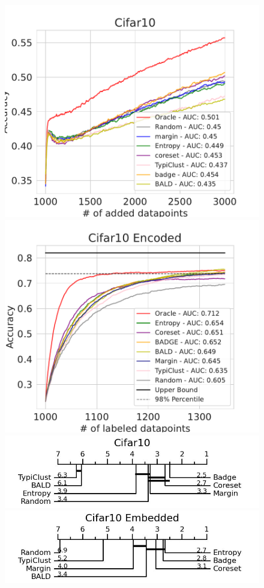 \documentclass[]{article}
\begin{document}
\begin{figure}[H]
\centering
\includegraphics[width=0.49\linewidth]{img/eval_cifar10}
\includegraphics[width=0.49\linewidth]{img/eval_cifar10_enc} \\ [2mm]
\includegraphics[width=0.49\linewidth]{img/micro_cifar10.jpg}
\includegraphics[width=0.49\linewidth]{img/micro_cifar10_enc.jpg} \\ [4mm]
\end{figure}
\end{document}
